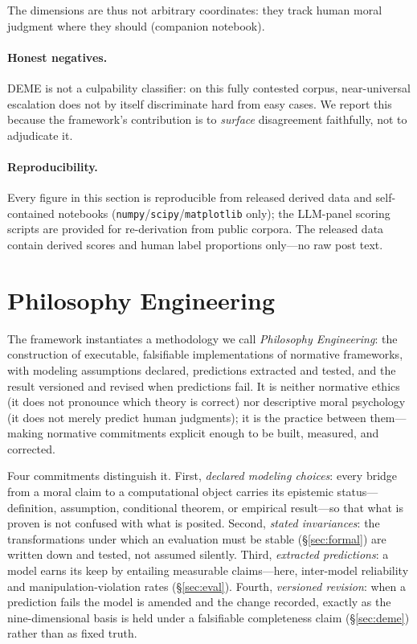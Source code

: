 The dimensions are thus
not arbitrary coordinates: they track human moral judgment where they should
(companion notebook).

\paragraph{Honest negatives.} DEME is not a culpability classifier: on this fully contested
corpus, near-universal escalation does not by itself discriminate hard from easy cases. We
report this because the framework's contribution is to \emph{surface} disagreement
faithfully, not to adjudicate it.

\paragraph{Reproducibility.} Every figure in this section is reproducible from released
derived data and self-contained notebooks (\texttt{numpy}/\texttt{scipy}/\texttt{matplotlib}
only); the LLM-panel scoring scripts are provided for re-derivation from public corpora. The
released data contain derived scores and human label proportions only---no raw post text.

\section{Philosophy Engineering}
\label{sec:phileng}
The framework instantiates a methodology we call \emph{Philosophy Engineering}: the
construction of executable, falsifiable implementations of normative frameworks, with modeling
assumptions declared, predictions extracted and tested, and the result versioned and revised
when predictions fail. It is neither normative ethics (it does not pronounce which theory is
correct) nor descriptive moral psychology (it does not merely predict human judgments); it is
the practice between them---making normative commitments explicit enough to be built, measured,
and corrected.

Four commitments distinguish it. First, \emph{declared modeling choices}: every bridge from a
moral claim to a computational object carries its epistemic status---definition, assumption,
conditional theorem, or empirical result---so that what is proven is not confused with what is
posited. Second, \emph{stated invariances}: the transformations under which an evaluation must
be stable (\S\ref{sec:formal}) are written down and tested, not assumed silently. Third,
\emph{extracted predictions}: a model earns its keep by entailing measurable claims---here,
inter-model reliability and manipulation-violation rates (\S\ref{sec:eval}). Fourth,
\emph{versioned revision}: when a prediction fails the model is amended and the change recorded,
exactly as the nine-dimensional basis is held under a falsifiable completeness claim
(\S\ref{sec:deme}) rather than as fixed truth.

